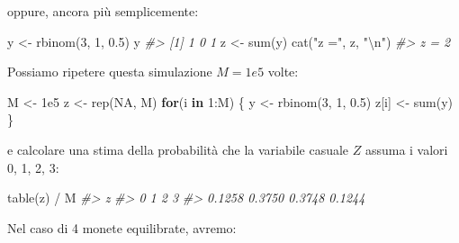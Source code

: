 \documentclass[
  11pt,
]{krantz}
\makeatletter
\newenvironment{Shaded}{\begin{snugshade}}{\end{snugshade}}
\newcommand{\CommentTok}[1]{\textcolor[rgb]{0.37,0.37,0.37}{\textit{#1}}}
\newcommand{\ConstantTok}[1]{\textcolor[rgb]{0,0,0}{#1}}
\newcommand{\ControlFlowTok}[1]{\textcolor[rgb]{0.27,0.27,0.27}{\textbf{#1}}}
\newcommand{\DecValTok}[1]{\textcolor[rgb]{0.06,0.06,0.06}{#1}}
\newcommand{\FloatTok}[1]{\textcolor[rgb]{0.06,0.06,0.06}{#1}}
\newcommand{\FunctionTok}[1]{\textcolor[rgb]{0,0,0}{#1}}
\newcommand{\NormalTok}[1]{#1}
\newcommand{\OtherTok}[1]{\textcolor[rgb]{0.37,0.37,0.37}{#1}}
\newcommand{\SpecialCharTok}[1]{\textcolor[rgb]{0,0,0}{#1}}
\newcommand{\StringTok}[1]{\textcolor[rgb]{0.5,0.5,0.5}{#1}}
\newenvironment{kframe}{%
\medskip{}
\setlength{\fboxsep}{.8em}
 \def\at@end@of@kframe{}%
 \ifinner\ifhmode%
  \def\at@end@of@kframe{\end{minipage}}%
  \begin{minipage}{\columnwidth}%
 \fi\fi%
 \def\FrameCommand##1{\hskip\@totalleftmargin \hskip-\fboxsep
 \colorbox{shadecolor}{##1}\hskip-\fboxsep
     \hskip-\linewidth \hskip-\@totalleftmargin \hskip\columnwidth}%
 \MakeFramed {\advance\hsize-\width
   \@totalleftmargin\z@ \linewidth\hsize
   \@setminipage}}%
 {\par\unskip\endMakeFramed%
 \at@end@of@kframe}
\renewenvironment{Shaded}{\begin{kframe}}{\end{kframe}}
\theoremstyle{definition}
\theoremstyle{definition}
\theoremstyle{definition}
\theoremstyle{definition}
\theoremstyle{remark}
\makeatother
\begin{document}
oppure, ancora più semplicemente:

\begin{Shaded}
\begin{Highlighting}[]
\NormalTok{y }\OtherTok{\textless{}{-}} \FunctionTok{rbinom}\NormalTok{(}\DecValTok{3}\NormalTok{, }\DecValTok{1}\NormalTok{, }\FloatTok{0.5}\NormalTok{)}
\NormalTok{y}
\CommentTok{\#\textgreater{} [1] 1 0 1}
\NormalTok{z }\OtherTok{\textless{}{-}} \FunctionTok{sum}\NormalTok{(y)}
\FunctionTok{cat}\NormalTok{(}\StringTok{"z ="}\NormalTok{, z, }\StringTok{"}\SpecialCharTok{\textbackslash{}n}\StringTok{"}\NormalTok{)}
\CommentTok{\#\textgreater{} z = 2}
\end{Highlighting}
\end{Shaded}

Possiamo ripetere questa simulazione \(M = 1e5\) volte:

\begin{Shaded}
\begin{Highlighting}[]
\NormalTok{M }\OtherTok{\textless{}{-}} \FloatTok{1e5}
\NormalTok{z }\OtherTok{\textless{}{-}} \FunctionTok{rep}\NormalTok{(}\ConstantTok{NA}\NormalTok{, M)}
\ControlFlowTok{for}\NormalTok{(i }\ControlFlowTok{in} \DecValTok{1}\SpecialCharTok{:}\NormalTok{M) \{}
\NormalTok{  y }\OtherTok{\textless{}{-}} \FunctionTok{rbinom}\NormalTok{(}\DecValTok{3}\NormalTok{, }\DecValTok{1}\NormalTok{, }\FloatTok{0.5}\NormalTok{)}
\NormalTok{  z[i] }\OtherTok{\textless{}{-}} \FunctionTok{sum}\NormalTok{(y)}
\NormalTok{\}}
\end{Highlighting}
\end{Shaded}

e calcolare una stima della probabilità che la variabile casuale \(Z\) assuma i valori 0, 1, 2, 3:

\begin{Shaded}
\begin{Highlighting}[]
\FunctionTok{table}\NormalTok{(z) }\SpecialCharTok{/}\NormalTok{ M}
\CommentTok{\#\textgreater{} z}
\CommentTok{\#\textgreater{}      0      1      2      3 }
\CommentTok{\#\textgreater{} 0.1258 0.3750 0.3748 0.1244}
\end{Highlighting}
\end{Shaded}

Nel caso di 4 monete equilibrate, avremo:
\end{document}
